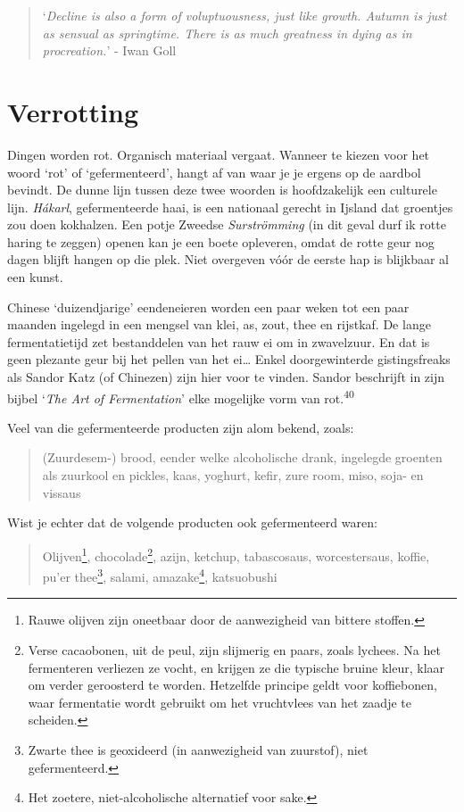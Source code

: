 \documentclass[
  11pt,
  dutch,
]{memoir}
\begin{document}
\label{microbio}

\begin{quote}
`\emph{Decline is also a form of voluptuousness, just like growth.
Autumn is just as sensual as springtime. There is as much greatness in
dying as in procreation.}' - Iwan Goll
\end{quote}

\hypertarget{verrotting}{%
\section{Verrotting}\label{verrotting}}

Dingen worden rot. Organisch materiaal vergaat. Wanneer te kiezen voor
het woord `rot' of `gefermenteerd', hangt af van waar je je ergens op de
aardbol bevindt. De dunne lijn tussen deze twee woorden is hoofdzakelijk
een culturele lijn. \emph{Hákarl}, gefermenteerde haai, is een nationaal
gerecht in Ijsland dat groentjes zou doen kokhalzen. Een potje Zweedse
\emph{Surströmming} (in dit geval durf ik rotte haring te zeggen) openen
kan je een boete opleveren, omdat de rotte geur nog dagen blijft hangen
op die plek. Niet overgeven vóór de eerste hap is blijkbaar al een
kunst.

Chinese `duizendjarige' eendeneieren worden een paar weken tot een paar
maanden ingelegd in een mengsel van klei, as, zout, thee en rijstkaf. De
lange fermentatietijd zet bestanddelen van het rauw ei om in zwavelzuur.
En dat is geen plezante geur bij het pellen van het ei\ldots{} Enkel
doorgewinterde gistingsfreaks als Sandor Katz (of Chinezen) zijn hier
voor te vinden. Sandor beschrijft in zijn bijbel `\emph{The Art of
Fermentation}' elke mogelijke vorm van rot.\textsuperscript{40}

Veel van die gefermenteerde producten zijn alom bekend, zoals:

\begin{quote}
(Zuurdesem-) brood, eender welke alcoholische drank, ingelegde groenten
als zuurkool en pickles, kaas, yoghurt, kefir, zure room, miso, soja- en
vissaus
\end{quote}

Wist je echter dat de volgende producten ook gefermenteerd waren:

\begin{quote}
Olijven\footnote{Rauwe olijven zijn oneetbaar door de aanwezigheid van
  bittere stoffen.}, chocolade\footnote{Verse cacaobonen, uit de peul,
  zijn slijmerig en paars, zoals lychees. Na het fermenteren verliezen
  ze vocht, en krijgen ze die typische bruine kleur, klaar om verder
  geroosterd te worden. Hetzelfde principe geldt voor koffiebonen, waar
  fermentatie wordt gebruikt om het vruchtvlees van het zaadje te
  scheiden.}, azijn, ketchup, tabascosaus, worcestersaus, \mbox{koffie},
pu'er thee\footnote{Zwarte thee is geoxideerd (in aanwezigheid van
  zuurstof), niet gefermenteerd.}, salami, amazake\footnote{Het zoetere,
  niet-alcoholische alternatief voor sake.}, katsuobushi
\end{quote}
\end{document}
